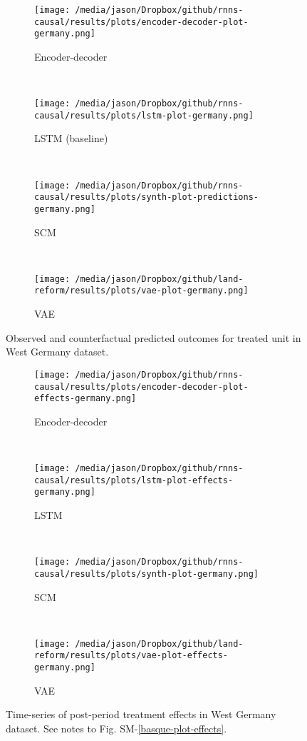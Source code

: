 \documentclass[12pt]{article}
\begin{document}
\begin{figure*}[htbp] %
    \centering
    \begin{subfigure}[t]{0.5\textwidth}
        \centering
        \texttt{[image: /media/jason/Dropbox/github/rnns-causal/results/plots/encoder-decoder-plot-germany.png]}
        \caption{Encoder-decoder}
    \end{subfigure}%
        ~ 
    \begin{subfigure}[t]{0.5\textwidth}
        \centering
        \texttt{[image: /media/jason/Dropbox/github/rnns-causal/results/plots/lstm-plot-germany.png]}
        \caption{LSTM (baseline)}
    \end{subfigure}
        ~ 
    \begin{subfigure}[t]{0.5\textwidth}
        \centering
        \texttt{[image: /media/jason/Dropbox/github/rnns-causal/results/plots/synth-plot-predictions-germany.png]}
        \caption{SCM}
    \end{subfigure}%
        ~ 
	\begin{subfigure}[t]{0.5\textwidth}
		\centering
		\texttt{[image: /media/jason/Dropbox/github/land-reform/results/plots/vae-plot-germany.png]}
		\caption{VAE}
	\end{subfigure}
    \caption{Observed and counterfactual predicted outcomes for treated unit in West Germany dataset.\label{germany-plot}}
\end{figure*}


\begin{figure*}[htbp]
	\centering
	\begin{subfigure}[t]{0.5\textwidth}
		\centering
		\texttt{[image: /media/jason/Dropbox/github/rnns-causal/results/plots/encoder-decoder-plot-effects-germany.png]}
		\caption{Encoder-decoder}
	\end{subfigure}%
	~ 
	\begin{subfigure}[t]{0.5\textwidth}
		\centering
		\texttt{[image: /media/jason/Dropbox/github/rnns-causal/results/plots/lstm-plot-effects-germany.png]}
		\caption{LSTM}
	\end{subfigure}
	~ 
	\begin{subfigure}[t]{0.5\textwidth}
		\centering
		\texttt{[image: /media/jason/Dropbox/github/rnns-causal/results/plots/synth-plot-germany.png]}
		\caption{SCM}
	\end{subfigure}%
	~ 
	\begin{subfigure}[t]{0.5\textwidth}
		\centering
		\texttt{[image: /media/jason/Dropbox/github/land-reform/results/plots/vae-plot-effects-germany.png]}
		\caption{VAE}
	\end{subfigure}
	\caption{Time-series of post-period treatment effects in West Germany dataset. See notes to Fig. SM-\ref{basque-plot-effects}.\label{germany-plot-effects}}
\end{figure*}
\end{document}
